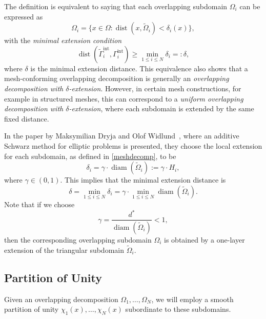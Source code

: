 \documentclass[a4paper, 11pt]{article}
\theoremstyle{remark}
\begin{document}
\noindent The definition is equivalent to saying that each overlapping subdomain $\Omega_i$ can be expressed as
\begin{equation*}
    \Omega_{i} = \{x\in\Omega : \operatorname{dist}(x, \widetilde{\Omega}_{i}) < \delta_{i}(x)\},
\end{equation*}
with the \textit{minimal extension condition}
\begin{equation*}
    \operatorname{dist}(\widetilde{\Gamma}_i^{\text{int}}, \Gamma_i^{\text{int}}) \geq \min_{1\leq i \leq N}\delta_{i} = : \delta,
\end{equation*}
where $\delta$ is the minimal extension distance. This equivalence also shows that a mesh-conforming overlapping decomposition is generally an 
\emph{overlapping decomposition with $\delta$-extension}. However, in certain mesh constructions, for example in structured meshes, this can 
correspond to a \emph{uniform overlapping decomposition with $\delta$-extension}, where each subdomain is extended by the same fixed distance.

\vspace{10pt}
\noindent In the paper by Maksymilian Dryja and Olof Widlund~\cite{DryjaWidlund1987}, where an additive Schwarz method for elliptic problems is presented, they choose the local extension for each subdomain, as defined in \ref{meshdecomp}, to be
\begin{equation*}
    \delta_i = \gamma \cdot \operatorname{diam}(\widetilde{\Omega}_{i}) := \gamma \cdot H_{i},
\end{equation*}
where $\gamma \in (0,1)$. This implies that the minimal extension distance is 
\begin{equation*}
    \delta = \min_{1\leq i \leq N}\delta_{i} = \gamma \cdot \min_{1\leq i \leq N}\operatorname{diam}(\widetilde{\Omega}_{i}).
\end{equation*}
Note that if we choose
\begin{equation*}
    \gamma = \dfrac{d^{*}}{\operatorname{diam}(\widetilde{\Omega}_{i})} < 1,
\end{equation*}
then the corresponding overlapping subdomain $\Omega_i$ is obtained by a one-layer extension of the triangular subdomain $\widetilde{\Omega}_i$.

\subsection{Partition of Unity}

Given an overlapping decomposition $\Omega_{1}, \ldots, \Omega_{N}$, we will employ a smooth partition of unity $\chi_{1}(x), \ldots, \chi_{N}(x)$ subordinate to these subdomains.
\end{document}
